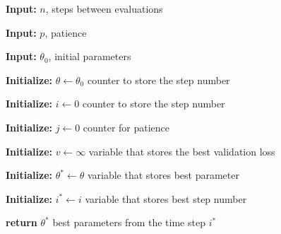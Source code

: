 \documentclass{article}
\begin{document}
    \setlength{\interspacetitleruled}{-.4pt}
    \begin{algorithm}

    
    \textbf{Input:}
    $n$, steps between evaluations
    
    \textbf{Input:}
    $p$, patience
    
    \textbf{Input:}
    $\theta_{0}$, initial parameters
    
    \textbf{Initialize:}
    $\theta \gets \theta_{0}$ counter to store the step number
    
    \textbf{Initialize:}
    $i \gets 0$ counter to store the step number
    
    \textbf{Initialize:}
    $j \gets 0$ counter for patience

    \textbf{Initialize:}
    $v \gets \infty$ variable that stores the best validation loss
    
    \textbf{Initialize:}
    $\theta^{*} \gets \theta$ variable that stores best parameter
    
    \textbf{Initialize:}
    $i^{*} \gets i$ variable that stores best step number
    
	
    \textbf{return }
    $\theta^{*}$ best parameters from the time step $i^{*}$


    \end{algorithm}    
    
\end{document}
